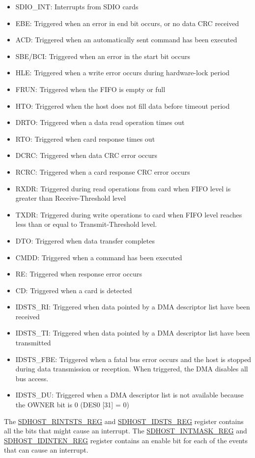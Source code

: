 \documentclass[main\_\_EN.tex]{subfiles}
\begin{document}
\begin{itemize}
\item SDIO\_INT: Interrupts from SDIO cards
\item EBE: Triggered when an error in end bit occurs, or no data CRC received 
\item ACD: Triggered when an automatically sent command has been executed
\item SBE/BCI: Triggered when an error in the start bit occurs
\item HLE: Triggered when a write error occurs during hardware-lock period
\item FRUN: Triggered when the FIFO is empty or full
\item HTO: Triggered when the host does not fill data before timeout period
\item DRTO: Triggered when a data read operation times out
\item RTO: Triggered when card response times out
\item DCRC: Triggered when data CRC error occurs
\item RCRC: Triggered when a card response CRC error occurs
\item RXDR: Triggered during read operations from card when FIFO level is greater than Receive-Threshold level
\item TXDR: Triggered during write operations to card when FIFO level reaches less than or equal to Transmit-Threshold level.
\item DTO: Triggered when data transfer completes
\item CMDD: Triggered when a command has been executed
\item RE: Triggered when response error occurs
\item CD: Triggered when a card is detected
\item IDSTS\_RI: Triggered when data pointed by a DMA descriptor list have been received
\item IDSTS\_TI: Triggered when data pointed by a DMA descriptor list have been transmitted
\item IDSTS\_FBE: Triggered when a fatal bus error occurs and the host is stopped during data transmission or reception. When triggered, the DMA disables all bus access.
\item IDSTS\_DU: Triggered when a DMA descriptor list is not available because the OWNER bit is 0 (DES0 [31] = 0)
\end{itemize}

The \hyperref[regdesc:SDHOSTRINTSTSREG]{SDHOST\_RINTSTS\_REG} and \hyperref[regdesc:SDHOSTIDSTSREG]{SDHOST\_IDSTS\_REG} register contains all the bits that might cause an interrupt. The \hyperref[regdesc:SDHOSTINTMASKREG]{SDHOST\_INTMASK\_REG} and \hyperref[regdesc:SDHOSTIDINTENREG]{SDHOST\_IDINTEN\_REG} register contains an enable bit for each of the events that can cause an interrupt. 
\end{document}
